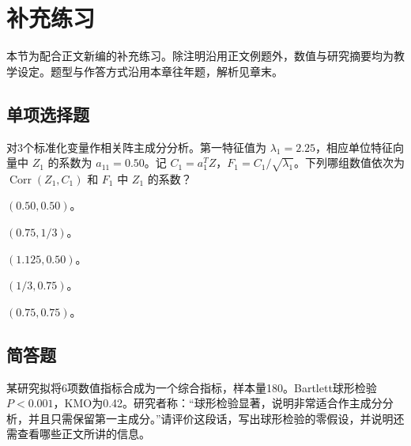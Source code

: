 
\clearpage\section{补充练习}

本节为配合正文新编的补充练习。除注明沿用正文例题外，数值与研究摘要均为教学设定。题型与作答方式沿用本章往年题，解析见章末。

\par\addvspace{6pt}\noindent\begin{minipage}{\linewidth}

\subsection{单项选择题}


对3个标准化变量作相关阵主成分分析。第一特征值为 \(\lambda_1=2.25\)，相应单位特征向量中 \(Z_1\) 的系数为 \(a_{11}=0.50\)。记 \(C_1=a_1^TZ\)，\(F_1=C_1/\sqrt{\lambda_1}\)。下列哪组数值依次为 \(\operatorname{Corr}(Z_1,C_1)\) 和 \(F_1\) 中 \(Z_1\) 的系数？


\begin{choices}

\item \((0.50,0.50)\)。

\item \((0.75,1/3)\)。

\item \((1.125,0.50)\)。

\item \((1/3,0.75)\)。

\item \((0.75,0.75)\)。

\end{choices}

\end{minipage}\par\vspace{4pt}

\par\addvspace{6pt}\noindent\begin{minipage}{\linewidth}

\subsection{简答题}


某研究拟将6项数值指标合成为一个综合指标，样本量180。Bartlett球形检验 \(P<0.001\)，KMO为0.42。研究者称：``球形检验显著，说明非常适合作主成分分析，并且只需保留第一主成分。''请评价这段话，写出球形检验的零假设，并说明还需查看哪些正文所讲的信息。



\end{minipage}\par\vspace{4pt}


